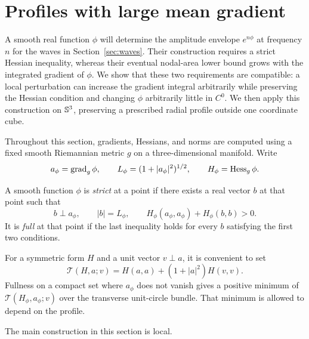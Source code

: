 \section{Profiles with large mean gradient}
\label{sec:profiles}

A smooth real function $\phi$ will determine the amplitude envelope
$e^{n\phi}$ at frequency $n$ for the waves in Section~\ref{sec:waves}.
Their construction
requires a strict Hessian inequality, whereas their eventual nodal-area
lower bound grows with the integrated gradient of $\phi$.  We show that
these two requirements are compatible: a local perturbation can increase
the gradient integral arbitrarily while preserving the Hessian condition
and changing $\phi$ arbitrarily little in $C^0$.  We then apply this
construction on $\mathbb S^3$, preserving a prescribed radial profile
outside one coordinate cube.

Throughout this section, gradients, Hessians, and norms are computed using a
fixed smooth Riemannian metric $g$ on a three-dimensional manifold.  Write
\[
 a_\phi=\operatorname{grad}_g\phi,\qquad
 L_\phi=(1+|a_\phi|^2)^{1/2},\qquad H_\phi=\operatorname{Hess}_g\phi.
\]

\begin{definition}
\label{def:strict-profile}
A smooth function $\phi$ is \emph{strict} at a point if there exists a real
vector $b$ at that point such that
\begin{equation}
 b\perp a_\phi,\qquad |b|=L_\phi,\qquad
 H_\phi(a_\phi,a_\phi)+H_\phi(b,b)>0.
 \label{eq:profile-strict}
\end{equation}
It is \emph{full} at that point if the last inequality holds for every $b$
satisfying the first two conditions.
\end{definition}

For a symmetric form $H$ and a unit vector $v\perp a$, it is convenient to set
\[
 \mathcal T(H,a;v)=H(a,a)+(1+|a|^2)H(v,v).
\]
Fullness on a compact set where $a_\phi$ does not vanish gives a positive
minimum of $\mathcal T(H_\phi,a_\phi;v)$ over the transverse unit-circle
bundle.  That minimum is allowed to depend on the profile.

The main construction in this section is local.

